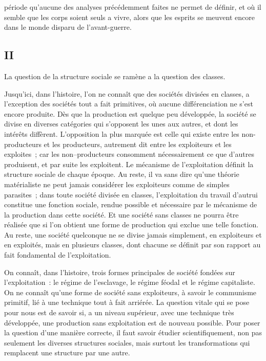 \documentclass[french,twoside]{book} %
\begin{document}
période qu'aucune des analyses précédemment faites ne permet de définir, et où il semble que les corps soient seuls a vivre, alors que les esprits se meuvent encore dans le monde disparu de l'avant-guerre.
\subsection[II]{II}
\noindent La question de la structure sociale se ramène a la question des classes.\par
Jusqu'ici, dans l'histoire, l'on ne connaît que des sociétés divisées en classes, a l'exception des sociétés tout a fait primitives, où aucune différenciation ne s'est encore produite. Dès que la production est quelque peu développée, la société se divise en diverses catégories qui s'opposent les unes aux autres, et dont les intérêts diffèrent. L'opposition la plus marquée est celle qui existe entre les non-producteurs et les producteurs, autrement dit entre les exploiteurs et les exploites ; car les non--producteurs consomment nécessairement ce que d'autres produisent, et par suite les exploitent. Le mécanisme de l'exploitation définit la structure sociale de chaque époque. Au reste, il va sans dire qu'une théorie matérialiste ne peut jamais considérer les exploiteurs comme de simples parasites ; dans toute société divisée en classes, l'exploitation du travail d'autrui constitue une fonction sociale, rendue possible et nécessaire par le mécanisme de la production dans cette société. Et une société sans classes ne pourra être réalisée que si l'on obtient une forme de production qui exclue une telle fonction. Au reste, une société quelconque ne se divise jamais simplement, en exploiteurs et en exploités, mais en plusieurs classes, dont chacune se définit par son rapport au fait fondamental de l'exploitation.\par
On connaît, dans l'histoire, trois formes principales de société fondées sur l'exploitation : le régime de l'esclavage, le régime féodal et le régime capitaliste. On ne connaît qu'une forme de société sans exploiteurs, à savoir le communisme primitif, lié à une technique tout à fait arriérée. La question vitale qui se pose pour nous est de savoir si, a un niveau supérieur, avec une technique très développée, une production sans exploitation est de nouveau possible. Pour poser la question d'une manière correcte, il faut savoir étudier scientifiquement, non pas seulement les diverses structures sociales, mais surtout les transformations qui remplacent une structure par une autre.\par
\end{document}

